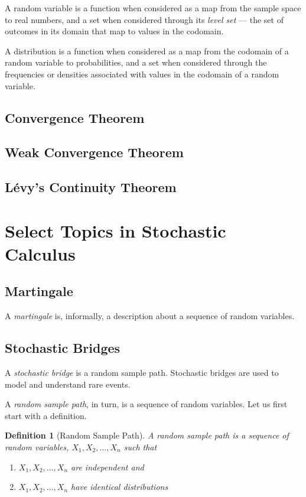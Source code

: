 \documentclass{article}
\newtheorem{definition}{Definition}
\begin{document}
A random variable is a function when considered as a map from the sample space to real numbers, and a set when considered through its \emph{level set} — the set of outcomes in its domain that map to values in the codomain.

A distribution is a function when considered as a map from the codomain of a random variable to probabilities, and a set when considered through the frequencies or densities associated with values in the codomain of a random variable.


\subsection{Convergence Theorem}

\subsection{Weak Convergence Theorem}

\subsection{Lévy's Continuity Theorem}



\newpage
\section{Select Topics in Stochastic Calculus}

\subsection{Martingale}

A \emph{martingale} is, informally, a description about a sequence of random variables.

\subsection{Stochastic Bridges}

A \emph{stochastic bridge} is a random sample path. Stochastic bridges are used to model and understand rare events.

A \emph{random sample path}, in turn, is a sequence of random variables. Let us first start with a definition.

\begin{mdframed}
\begin{definition}[Random Sample Path]
A \emph{random sample path} is a sequence of random variables, $ X_1, X_2,...,X_n $ such that
\begin{enumerate}
    \item $X_1, X_2, ..., X_n$ are independent \quad and
    \item $X_1, X_2, ..., X_n$ have identical distributions
\end{enumerate}
\end{definition}
\end{mdframed}
\end{document}
